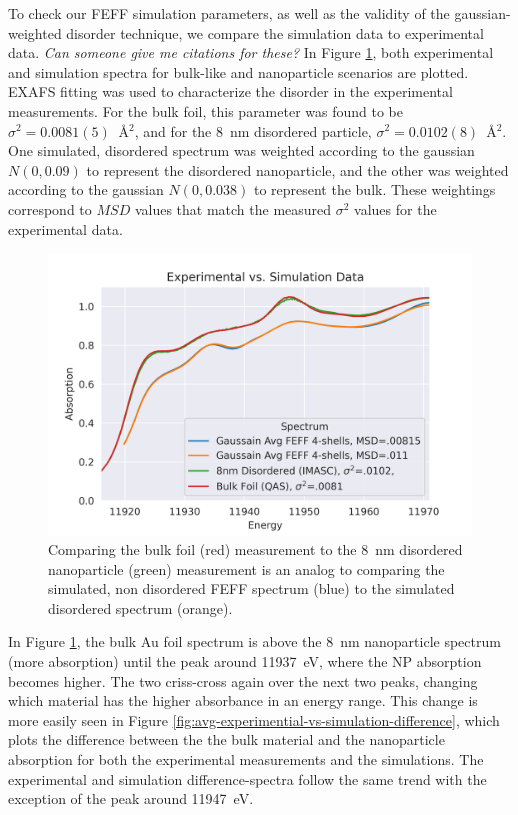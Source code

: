 To check our FEFF simulation parameters, as well as the validity of the gaussian-weighted disorder technique, we compare the simulation data to experimental data. \textit{Can someone give me citations for these?} In Figure \ref{fig:avg-experimental-vs-simulation}, both experimental and simulation spectra for bulk-like and nanoparticle scenarios are plotted. EXAFS fitting was used to characterize the disorder in the experimental measurements. For the bulk foil, this parameter was found to be $ \sigma^2=0.0081(5)~$ {\AA}$ ^2 $, and for the 8~nm disordered particle, $ \sigma^2=0.0102(8) $~{\AA}$ ^2 $.  One simulated, disordered spectrum was weighted according to the gaussian $ N(0, 0.09) $ to represent the disordered nanoparticle, and the other was weighted according to the gaussian $ N(0, 0.038)  $ to represent the bulk. These weightings correspond to $ MSD $ values that match the measured $ \sigma^2 $ values for the experimental data.  

\begin{figure}[h]
	\centering
	\includegraphics[width=.75\linewidth]{Chapters/Figures/updated_bulk_8nm_disorder_experimental_theory_comparison.png}
	\caption[Simulation vs. Experimental]{Comparing the bulk foil (red) measurement to the 8~nm disordered nanoparticle (green) measurement is an analog to comparing the simulated, non disordered FEFF spectrum (blue) to the simulated disordered spectrum (orange).}
	\label{fig:avg-experimental-vs-simulation}
\end{figure}

In Figure \ref{fig:avg-experimental-vs-simulation}, the bulk Au foil spectrum is above the 8~nm nanoparticle spectrum (more absorption) until the peak around 11937~eV, where the NP absorption becomes higher. The two criss-cross again over the next two peaks, changing which material has the higher absorbance in an energy range. This change is more easily seen in Figure \ref{fig:avg-experimential-vs-simulation-difference}, which plots the difference between the the bulk material and the nanoparticle absorption for both the experimental measurements and the simulations. The experimental and simulation difference-spectra follow the same trend with the exception of the peak around 11947~eV.


